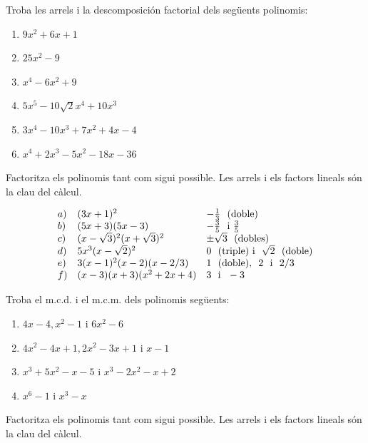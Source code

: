 \begin{exercici}
Troba les arrels i la descomposición factorial dels
següents polinomis:

\begin{enumerate}
\item[a)] $9x^{2}+6x+1$

\item[b)] $25x^{2}-9$

\item[c)] $x^{4}-6x^{2}+9$

\item[d)] $5x^{5}-10\sqrt{2}x^{4}+10x^{3}$

\item[e)] $3x^{4}-10x^{3}+7x^{2}+4x-4$

\item[f)] $x^{4}+2x^{3}-5x^{2}-18x-36$
\end{enumerate}
\end{exercici}
\begin{indicacio}
Factoritza els polinomis tant com sigui possible. Les arrels i els factors lineals són la clau del càlcul.
\end{indicacio}

\begin{solucio}
\[
\begin{array}{lll}
a) & (3x+1)^{2} & -\frac{1}{3}\text{ \ (doble)} \\
b) & (5x+3)(5x-3) & -\frac{3}{5}\text{ \ i }\frac{3}{5} \\
c) & (x-\sqrt{3})^{2}(x+\sqrt{3})^{2} & \pm \sqrt{3}\text{ \ (dobles) } \\
d) & 5x^{3}(x-\sqrt{2})^{2} & 0\text{ \ (triple) i \ }\sqrt{2}\text{ \
(doble)} \\
e) & 3(x-1)^{2}(x-2)(x-2/3) & 1\text{ \ (doble), \ }2\text{ \ i \ }2/3 \\
f) & (x-3)(x+3)(x^{2}+2x+4) & 3\text{ \ i \ }-3
\end{array}
\]
\end{solucio}

\begin{exercici}
Troba el m.c.d. i el m.c.m. dels polinomis següents:

\begin{enumerate}
\item[a)] $4x-4,x^{2}-1$ i $6x^{2}-6$

\item[b)] $4x^{2}-4x+1,2x^{2}-3x+1$ i $x-1$

\item[c)] $x^{3}+5x^{2}-x-5$ i $x^{3}-2x^{2}-x+2$

\item[d)] $x^{6}-1$ i $x^{3}-x$
\end{enumerate}
\end{exercici}
\begin{indicacio}
Factoritza els polinomis tant com sigui possible. Les arrels i els factors lineals són la clau del càlcul.
\end{indicacio}


